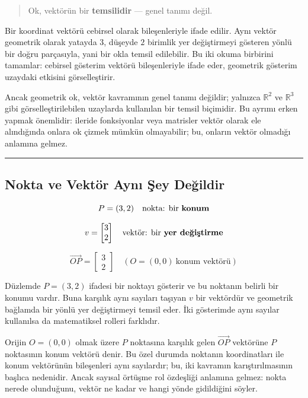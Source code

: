 \documentclass[
  a4paper,
  DIV=11,
  numbers=noendperiod]{scrartcl}
\begin{document}
\begin{quote}
Ok, vektörün bir \textbf{temsilidir} --- genel tanımı değil.
\end{quote}

Bir koordinat vektörü cebirsel olarak bileşenleriyle ifade edilir. Aynı
vektör geometrik olarak yatayda \(3\), düşeyde \(2\) birimlik yer
değiştirmeyi gösteren yönlü bir doğru parçasıyla, yani bir okla temsil
edilebilir. Bu iki okuma birbirini tamamlar: cebirsel gösterim vektörü
bileşenleriyle ifade eder, geometrik gösterim uzaydaki etkisini
görselleştirir.

Ancak geometrik ok, vektör kavramının genel tanımı değildir; yalnızca
\(\mathbb{R}^2\) ve \(\mathbb{R}^3\) gibi görselleştirilebilen uzaylarda
kullanılan bir temsil biçimidir. Bu ayrımı erken yapmak önemlidir:
ileride fonksiyonlar veya matrisler vektör olarak ele alındığında onlara
ok çizmek mümkün olmayabilir; bu, onların vektör olmadığı anlamına
gelmez.

\begin{center}\rule{0.5\linewidth}{0.5pt}\end{center}

\subsection{Nokta ve Vektör Aynı Şey
Değildir}\label{nokta-ve-vektuxf6r-aynux131-ux15fey-deux11fildir}

\[
P=(3,2)
\quad\text{nokta: bir \textbf{konum}}
\]

\[
v=\begin{bmatrix}3\\2\end{bmatrix}
\quad\text{vektör: bir \textbf{yer değiştirme}}
\]

\[
\overrightarrow{OP}=\begin{bmatrix}3\\2\end{bmatrix}
\quad (O=(0,0)\ \text{konum vektörü})
\]

Düzlemde \(P=(3,2)\) ifadesi bir noktayı gösterir ve bu noktanın belirli
bir konumu vardır. Buna karşılık aynı sayıları taşıyan \(v\) bir
vektördür ve geometrik bağlamda bir yönlü yer değiştirmeyi temsil eder.
İki gösterimde aynı sayılar kullanılsa da matematiksel rolleri
farklıdır.

Orijin \(O=(0,0)\) olmak üzere \(P\) noktasına karşılık gelen
\(\overrightarrow{OP}\) vektörüne \(P\) noktasının konum vektörü denir.
Bu özel durumda noktanın koordinatları ile konum vektörünün bileşenleri
aynı sayılardır; bu, iki kavramın karıştırılmasının başlıca nedenidir.
Ancak sayısal örtüşme rol özdeşliği anlamına gelmez: nokta nerede
olunduğunu, vektör ne kadar ve hangi yönde gidildiğini söyler.
\end{document}

